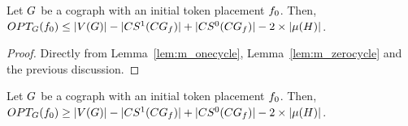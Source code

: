 \documentclass[msc,english,table,xcdraw]{ppgccufmg}
\begin{document}


\begin{lemma}
\label{lem:ub_cograph}
Let $G$ be a cograph with an initial token placement $f_{0}$.
Then, $OPT_{G}(f_{0}) \leq |V(G)| - 
|CS^{1}(CG_{f})| +
|CS^{0}(CG_{f})| - 2\times|\mu(H)|$.
\end{lemma}

\begin{proof}
Directly from Lemma~\ref{lem:m_onecycle}, Lemma~\ref{lem:m_zerocycle} and the previous discussion.
\end{proof}

\begin{lemma}
\label{lem:lb_cograph}
Let $G$ be a cograph with an initial token placement $f_{0}$.
Then, $OPT_{G}(f_{0}) \geq |V(G)| - 
|CS^{1}(CG_{f})| +
|CS^{0}(CG_{f})| - 2\times|\mu(H)|$.
\end{lemma}
\end{document}
